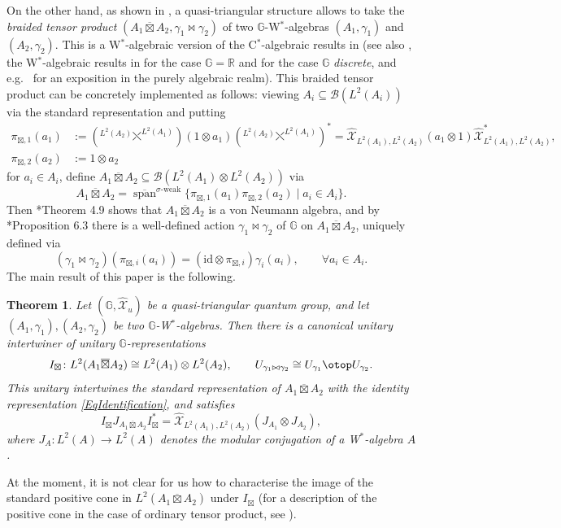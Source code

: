 \documentclass[reqno]{amsart}
\numberwithin{equation}{section}
\newtheorem*{Theorem*}{Theorem}
\newcommand{\R}{\mathbb{R}}
\newcommand{\mcB}{\mathcal{B}}
\newcommand{\id}{\mathrm{id}}
\newcommand{\G}{\mathbb{G}}
\newcommand{\barboxtimes}{\overline{\boxtimes}}
\newcommand{\mcX}{\mathcal{X}}
\newcommand{\ov}{\overline}
\newcommand{\mc}{\mathcal}
\newcommand{\wh}{\widehat}
\newcommand{\TensRep}{\otop}
\newcommand{\braidnew}[2]{{}^{#1}{\fdiagovrdiag}^{#2}}
\begin{document}
On the other hand, as shown in \cite{DCKr24}, a quasi-triangular structure allows to take the \emph{braided tensor product} $(A_1\barboxtimes A_2,\gamma_1\bowtie \gamma_2)$ of two $\G$-W$^*$-algebras $(A_1,\gamma_1)$ and $(A_2,\gamma_2)$. This is a W$^*$-algebraic version of the C$^*$-algebraic results in  \cites{NV10,MRW14,MRW16} (see also \cites{Kas15,BMRS19}, the W$^*$-algebraic results in \cite{Hou07} for the case $\G = \R$ and \cite{Moa18} for the case $\G$ \emph{discrete}, and e.g.\  \cite{Maj95} for an exposition in the purely algebraic realm). This braided tensor product can be concretely implemented as follows: viewing $A_i \subseteq \mcB(L^2(A_i))$ via the standard representation and putting
\begin{equation}\begin{split}\label{EqStandardRepBraid}
\pi_{\boxtimes,1}(a_1) &:=(\braidnew{L^2(A_2)}{L^2(A_1)}) (1\otimes a_1)(\braidnew{L^2(A_2)}{L^2(A_1)})^*=
\wh{\mc{X}}_{L^2(A_1),L^2(A_2)} (a_1\otimes 1)
\wh{\mc{X}}_{L^2(A_1),L^2(A_2)}^*
,\\
\pi_{\boxtimes,2}(a_2) &:= 
1\otimes a_2
\end{split}\end{equation}
for $a_i \in A_i$, define $A_1\barboxtimes A_2 \subseteq \mcB(L^2(A_1)\otimes L^2(A_2))$ via
\begin{equation}\label{EqIdentification}
A_1\barboxtimes A_2 = \overline{\operatorname{span}}^{\sigma\textrm{-weak}}\{\pi_{\boxtimes,1}(a_1)\pi_{\boxtimes,2}(a_2)\mid a_i\in A_i\}.
\end{equation}
Then \cite{DCKr24}*{Theorem 4.9} shows that $A_1\ov\boxtimes A_2$ is a von Neumann algebra,  and by \cite{DCKr24}*{Proposition 6.3} there is a well-defined action $\gamma_1\bowtie\gamma_2$ of $\G$ on $A_1\barboxtimes A_2$, uniquely defined via 
\begin{equation}\label{EqIdentification2}
(\gamma_1 \bowtie \gamma_2)(\pi_{\boxtimes,i}(a_i)) = (\id\otimes \pi_{\boxtimes,i})\gamma_i(a_i),\qquad \forall a_i \in A_i. 
\end{equation}
The main result of this paper is the following. 

\begin{Theorem*}
Let $(\G,\wh{\mcX}_u)$ be a quasi-triangular quantum group, and let $(A_1,\gamma_1),(A_2,\gamma_2)$ be two $\G$-W$^*$-algebras. Then there is a canonical unitary intertwiner of unitary $\G$-representations 
\[
I_\boxtimes \colon L^2(A_1 \barboxtimes A_2) \cong L^2(A_1) \otimes L^2(A_2), \qquad U_{\gamma_1\bowtie \gamma_2}\cong U_{\gamma_1} \TensRep U_{\gamma_2}.
\]
This unitary intertwines the standard representation of $A_1\ov{\boxtimes} A_2$ with the identity representation \eqref{EqIdentification}, and satisfies 
\[
I_\boxtimes J_{A_1\barboxtimes A_2}I^*_\boxtimes  =\wh{\mcX}_{L^2(A_1),L^2(A_2)}(J_{A_1}\otimes J_{A_2}),
\]
where $J_A\colon L^2(A) \rightarrow L^2(A)$ denotes the modular conjugation of a W$^*$-algebra $A$.
\end{Theorem*} 
At the moment, it is not clear for us how to characterise the image of the standard positive cone in $L^2(A_1\barboxtimes A_2)$ under $I_\boxtimes$ (for a description of the positive cone in the case of ordinary tensor product, see \cite{MT84}).
\end{document}
